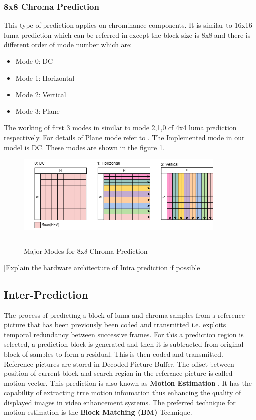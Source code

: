 \subsubsection{8x8 Chroma Prediction}
This type of prediction applies on chrominance components. It is similar to 16x16 luma prediction which can be referred in \cite{richardson2010h264} except the block size is 8x8 and there is different order of mode number which are:

\begin{itemize}
	\item Mode 0: DC
	\item Mode 1: Horizontal
	\item Mode 2: Vertical
	\item Mode 3: Plane
\end{itemize}

The working of first 3 modes in similar to mode 2,1,0 of 4x4 luma prediction respectively. For details of Plane mode refer to \cite{richardson2010h264}. The Implemented mode in our model is DC. These modes are shown in the figure \ref{fig:8x8modes}.

\begin{figure}[htbp]
	\centering
	\includegraphics[width = 4in]{./Figures/8x8modes.png}
	\rule{35em}{0.5pt}
	\caption{Major Modes for 8x8 Chroma Prediction}
	\label{fig:8x8modes}
\end{figure}

[Explain the hardware architecture of Intra prediction if possible]

\subsection{Inter-Prediction}
The process of predicting a block of luma and chroma samples from a reference picture that has been previously been coded and transmitted i.e. exploits temporal redundancy between successive frames. For this a prediction region is selected, a prediction block is generated and then it is subtracted from original block of samples to form a residual. This is then coded and transmitted. Reference pictures are stored in Decoded Picture Buffer. The offset between position of current block and search region in the reference picture is called motion vector. This prediction is also known as \textbf{Motion Estimation} \cite{kalaycioglu2011low}. It has the capability of extracting true motion information thus enhancing the quality of displayed images in video enhancement systems. The preferred technique for motion estimation is the \textbf{Block Matching (BM)} Technique. 

